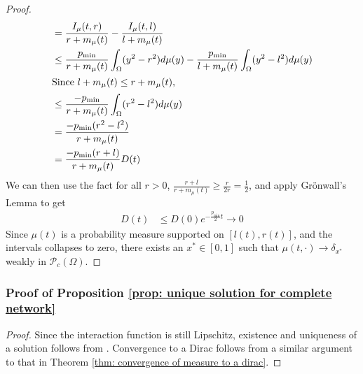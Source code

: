 \documentclass[10pt]{article}
\begin{document}
\begin{proof}
\begin{align*}
        &=  \frac{I_\mu(t,r)}{r + m_\mu(t)} -  \frac{I_\mu(t,l)}{l + m_\mu(t)}\\
        &\leq \frac{p_{\min}}{r+m_\mu(t)} \int_\Omega(y^2-r^2) d\mu(y) -  \frac{p_{\min}}{l+m_\mu(t)} \int_\Omega(y^2-l^2)d\mu(y)\\ 
        \intertext{Since $l+m_\mu(t) \leq r+m_\mu(t)$,}
        &\leq \frac{-p_{\min}}{r+m_\mu(t)}  \int_\Omega (r^2-l^2)d\mu(y)\\
         &= \frac{-p_{\min}(r^2-l^2)}{r+m_\mu(t)}\\
         &= \frac{-p_{\min}(r+l)}{r+m_\mu(t)}D(t)
    \end{align*}
    We can then use the fact for all $r>0$, $\frac{r+l}{r+m_\mu(t)}  \geq \frac{r}{2r}=\frac{1}{2}$, and apply Gr\"onwall's Lemma to get 
    \begin{align*}
        D(t) &\leq D(0) e^{-\frac{p_{\min}}{2} t} \to 0
    \end{align*}
    Since $\mu(t)$ is a probability measure supported on $[l(t),r(t)]$, and the intervals collapses to zero, there exists an $x^* \in [0,1]$ such that $\mu(t,\cdot)\rightarrow\delta_{x^*}$ weakly in $\mathcal{P}_c(\Omega)$.
\end{proof}

\subsubsection*{Proof of Proposition \ref{prop: unique solution for complete network}}
\begin{proof}
    Since the interaction function is still Lipschitz, existence and uniqueness of a solution follows from \cite{Bonnet2017ThePM}. Convergence to a Dirac follows from a similar argument to that in Theorem \ref{thm: convergence of measure to a dirac}.
\end{proof}
\end{document}
